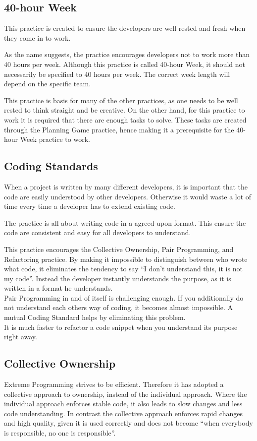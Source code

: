 \subsection{40-hour Week}
This practice is created to ensure the developers are well rested and fresh when they come in to work.

As the name suggests, the practice encourages developers not to work more than 40 hours per week. 
Although this practice is called 40-hour Week, it should not necessarily be specified to 40 hours per week.
The correct week length will depend on the specific team.

This practice is basis for many of the other practices, as one needs to be well rested to think straight and be creative.
On the other hand, for this practice to work it is required that there are enough tasks to solve.
These tasks are created through the Planning Game practice, hence making it a prerequisite for the 40-hour Week practice to work. 

\subsection{Coding Standards}
When a project is written by many different developers, it is important that the code are easily understood by other developers.
Otherwise it would waste a lot of time every time a developer has to extend existing code.

The practice is all about writing code in a agreed upon format.
This ensure the code are consistent and easy for all developers to understand.

This practice encourages the Collective Ownership, Pair Programming, and Refactoring practice.
By making it impossible to distinguish between who wrote what code, it eliminates the tendency to say ``I don't understand this, it is not my code”. Instead the developer instantly understands the purpose, as it is written in a format he understands.\\
Pair Programming in and of itself is challenging enough. If you additionally do not understand each others way of coding, it becomes almost impossible. 
A mutual Coding Standard helps by eliminating this problem.\\
It is much faster to refactor a code snippet when you understand its purpose right away.

\subsection{Collective Ownership}
Extreme Programming strives to be efficient.
Therefore it has adopted a collective approach to ownership, instead of the individual approach.
Where the individual approach enforces stable code, it also leads to slow changes and less code understanding.
In contrast the collective approach enforces rapid changes and high quality, given it is used correctly and does not become ``when everybody is responsible, no one is responsible”.

